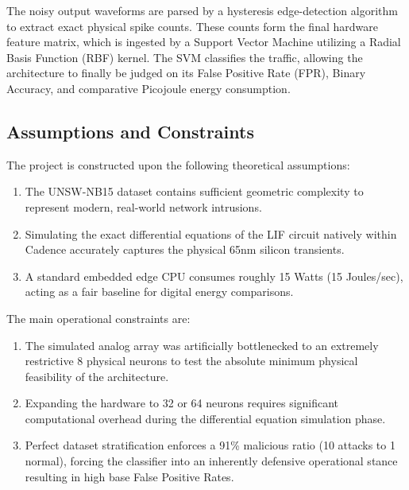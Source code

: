 \documentclass{ieeeaccess}
\begin{document}
The noisy output waveforms are parsed by a hysteresis edge-detection algorithm to extract exact physical spike counts. These counts form the final hardware feature matrix, which is ingested by a Support Vector Machine utilizing a Radial Basis Function (RBF) kernel. The SVM classifies the traffic, allowing the architecture to finally be judged on its False Positive Rate (FPR), Binary Accuracy, and comparative Picojoule energy consumption.

\subsection{Assumptions and Constraints}

The project is constructed upon the following theoretical assumptions:
\begin{enumerate}
\item The UNSW-NB15 dataset contains sufficient geometric complexity to represent modern, real-world network intrusions.
\item Simulating the exact differential equations of the LIF circuit natively within Cadence accurately captures the physical 65nm silicon transients.
\item A standard embedded edge CPU consumes roughly 15 Watts (15 Joules/sec), acting as a fair baseline for digital energy comparisons.
\end{enumerate}

The main operational constraints are:
\begin{enumerate}
\item The simulated analog array was artificially bottlenecked to an extremely restrictive 8 physical neurons to test the absolute minimum physical feasibility of the architecture.
\item Expanding the hardware to 32 or 64 neurons requires significant computational overhead during the differential equation simulation phase.
\item Perfect dataset stratification enforces a 91\% malicious ratio (10 attacks to 1 normal), forcing the classifier into an inherently defensive operational stance resulting in high base False Positive Rates.
\end{enumerate}
\end{document}
